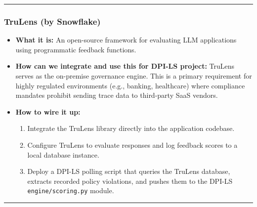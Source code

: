\documentclass[11pt,a4paper]{article}
\begin{document}
\vspace{0.2cm}\hrule\vspace{0.2cm}

\subsubsection*{TruLens (by Snowflake)}
\begin{itemize}
    \item \textbf{What it is:} An open-source framework for evaluating LLM applications using programmatic feedback functions.
    \item \textbf{How can we integrate and use this for DPI-LS project:} TruLens serves as the on-premise governance engine. This is a primary requirement for highly regulated environments (e.g., banking, healthcare) where compliance mandates prohibit sending trace data to third-party SaaS vendors.
    \item \textbf{How to wire it up:}
    \begin{enumerate}
        \item Integrate the TruLens library directly into the application codebase.
        \item Configure TruLens to evaluate responses and log feedback scores to a local database instance.
        \item Deploy a DPI-LS polling script that queries the TruLens database, extracts recorded policy violations, and pushes them to the DPI-LS \texttt{engine/scoring.py} module.
    \end{enumerate}
\end{itemize}

\vspace{0.2cm}\hrule\vspace{0.2cm}
\end{document}
